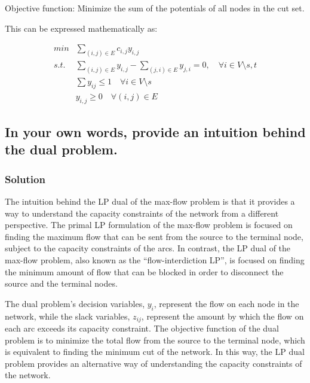 \documentclass[11pt]{article}
\begin{document}
Objective function: Minimize the sum of the potentials of all nodes in
the cut set.

This can be expressed mathematically as:

\[ \begin{align*}
min &\sum_{(i,j) \in E} c_{i,j}y_{i,j}
\\ s.t. &\sum_{(i,j) \in E}y_{i,j}-\sum_{(j,i) \in E}y_{j,i} = 0, \quad \forall i \in V\setminus {s,t}
\\ &\sum{y_{ij}} \leq 1 \quad \forall i \in V\setminus {s}
\\ &y_{i,j} \geq 0 \quad \forall (i,j) \in E \end{align*}\]

\hypertarget{in-your-own-words-provide-an-intuition-behind-the-dual-problem.}{%
\subsection{In your own words, provide an intuition behind the dual
problem.}\label{in-your-own-words-provide-an-intuition-behind-the-dual-problem.}}

\hypertarget{solution-2}{%
\subsubsection{Solution}\label{solution-2}}

The intuition behind the LP dual of the max-flow problem is that it
provides a way to understand the capacity constraints of the network
from a different perspective. The primal LP formulation of the max-flow
problem is focused on finding the maximum flow that can be sent from the
source to the terminal node, subject to the capacity constraints of the
arcs. In contrast, the LP dual of the max-flow problem, also known as
the ``flow-interdiction LP'', is focused on finding the minimum amount
of flow that can be blocked in order to disconnect the source and the
terminal nodes.

The dual problem's decision variables, \(y_i\), represent the flow on
each node in the network, while the slack variables, \(z_{ij}\),
represent the amount by which the flow on each arc exceeds its capacity
constraint. The objective function of the dual problem is to minimize
the total flow from the source to the terminal node, which is equivalent
to finding the minimum cut of the network. In this way, the LP dual
problem provides an alternative way of understanding the capacity
constraints of the network.
\end{document}
